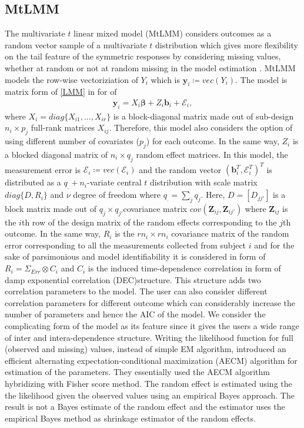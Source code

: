 \documentclass[]{article}
\begin{document}
		\subsection{MtLMM}
		The multivariate $t$ linear mixed model (MtLMM) considers outcomes as a random vector sample of a multivariate $t$ distribution which gives more flexibility on the tail feature of the symmetric responses by considering missing values, whether at random or not at random missing in the model estimation \citep{WangMtLMM2013}. MtLMM models the row-wise vectoriziation of $Y_i$ which is $\mathbf{y}_i\coloneqq vec(Y_i)$. The model is matrix form of \eqref{LMM} in for of 
		\begin{eqnarray*}
			\mathbf{y}_i=X_i\boldsymbol{\beta}+Z_i\mathbf{b}_i+\boldsymbol{\mathcal{E}}_i,
		\end{eqnarray*}
		where $X_i=diag\{X_{i1},\ldots,X_{ir}\}$ is a block-diagonal matrix made out of sub-design $n_i\times p_j$ full-rank matrices $X_{ij}$. Therefore, this model also considers the option of using different number of covariates ($p_j$) for each outcome. In the same way, $Z_i$ is a blocked diagonal matrix of $n_i\times q_j$ random effect matrices. In this model, the measurement error is $\boldsymbol{\mathcal{E}}_i\coloneqq vec(\mathcal{E}_i)$ and the random vector $\left(\mathbf{b}_i^T,\boldsymbol{\mathcal{E}}_i^T\right)^T$ is distributed as a $q_.+n_i$-variate central $t$ distribution with scale matrix $diag\{D,R_i\}$ and $\nu$ degree of freedom where $q_.=\sum_j q_j$. Here, $D=[D_{jj'}]$ is a block matrix made out of $q_j\times q_{j'}$covariance matrix $cov(\mathbf{Z}_{ij},\mathbf{Z}_{ij'})$ where $\mathbf{Z}_{ij}$ is the $i$th row of the design matrix of the random effects corresponding to the $j$th outcome. In the same way, $R_i$ is the $rn_i\times rn_i$ covariance matrix of the random error corresponding to all the measurements collected from subject $i$ and for the sake of parsimonious and model identifiability it is considered in form of $R_i=\Sigma_{Err}\otimes C_i$ and $C_i$ is the induced time-dependence correlation in form of damp exponential correlation (DEC)structure. This structure adds two correlation parameters to the model. The user can also consider different correlation parameters for different outcome which can considerably increase the number of parameters and hence the AIC of the model. We consider the complicating form of the model as its feature since it gives the users a wide range of inter and intera-dependence structure. Writing the likelihood function for full (observed and missing) values, instead of simple EM algorithm, \cite{WangMtLMM2013} introduced an efficient alternating expectation-conditional maximization (AECM) algorithm for estimation of the parameters. They essentially used the AECM algorithm hybridizing with Fisher score method. The random effect is estimated using the the likelihood given the observed values using an empirical Bayes approach. The result is not a Bayes estimate of the random effect and the estimator uses the empirical Bayes method \cite[][Page 78]{VerbekeMolenberghs2009} as shrinkage estimator of the random effects. 
		
\end{document}
